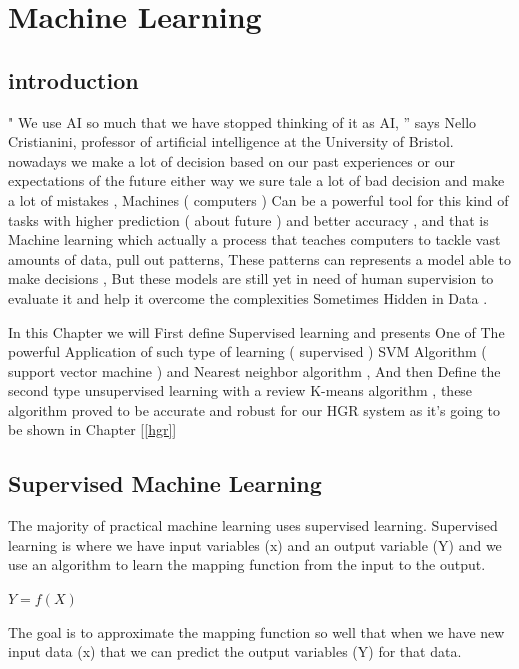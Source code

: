 
\chapter{Machine Learning}

\section{introduction}

" We use AI so much that we have stopped thinking of it as AI, ”  says Nello Cristianini,  professor of artificial  intelligence at the University of Bristol.   
nowadays we make a lot of decision based on our past experiences  or our expectations of the future either way we sure tale  a lot of bad decision and make a lot of mistakes , Machines ( computers ) Can be a powerful tool for this kind of tasks with higher prediction ( about future )  and better accuracy , and that is Machine learning which actually a process  that teaches computers to tackle vast amounts of data, pull out patterns, These patterns can represents a model able to  make decisions , But these models are still yet in need of human supervision to evaluate it and help it overcome the complexities Sometimes Hidden in Data .

In this Chapter we will First define Supervised learning and presents One of The powerful Application of such type of learning ( supervised ) SVM Algorithm ( support vector machine )  and Nearest neighbor algorithm , And then Define the second type unsupervised learning   with a review K-means algorithm , these algorithm  proved  to be accurate and robust  for our HGR system as it's going to be shown in  Chapter  [\ref{hgr}]

\section{Supervised Machine Learning}

The majority of practical machine learning uses supervised learning.
Supervised learning is where we have input variables (x) and an output variable (Y) and we use an algorithm to learn the mapping function from the input to the output.

$Y = f(X)$

The goal is to approximate the mapping function so well that when we have new input data (x) that we can predict the output variables (Y) for that data.

